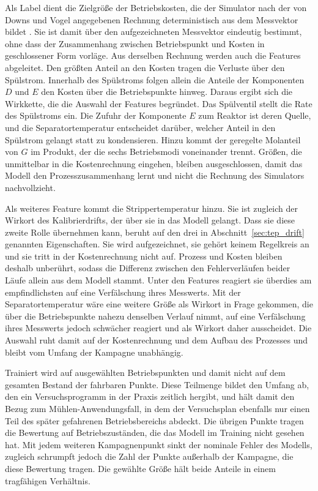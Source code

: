%
Als Label dient die Zielgröße der Betriebskosten, die der Simulator nach der von Downs und Vogel angegebenen Rechnung deterministisch aus dem Messvektor bildet \cite{downs.1993}. Sie ist damit über den aufgezeichneten Messvektor eindeutig bestimmt, ohne dass der Zusammenhang zwischen Betriebspunkt und Kosten in geschlossener Form vorläge. Aus derselben Rechnung werden auch die Features abgeleitet. Den größten Anteil an den Kosten tragen die Verluste über den Spülstrom. Innerhalb des Spülstroms folgen allein die Anteile der Komponenten $D$ und $E$ den Kosten über die Betriebspunkte hinweg. Daraus ergibt sich die Wirkkette, die die Auswahl der Features begründet. Das Spülventil stellt die Rate des Spülstroms ein. Die Zufuhr der Komponente $E$ zum Reaktor ist deren Quelle, und die Separatortemperatur entscheidet darüber, welcher Anteil in den Spülstrom gelangt statt zu kondensieren. Hinzu kommt der geregelte Molanteil von $G$ im Produkt, der die sechs Betriebsmodi voneinander trennt. Größen, die unmittelbar in die Kostenrechnung eingehen, bleiben ausgeschlossen, damit das Modell den Prozesszusammenhang lernt und nicht die Rechnung des Simulators nachvollzieht. \par
%
Als weiteres Feature kommt die Strippertemperatur hinzu. Sie ist zugleich der Wirkort des Kalibrierdrifts, der über sie in das Modell gelangt. Dass sie diese zweite Rolle übernehmen kann, beruht auf den drei in Abschnitt~\ref{sec:tep_drift} genannten Eigenschaften. Sie wird aufgezeichnet, sie gehört keinem Regelkreis an und sie tritt in der Kostenrechnung nicht auf. Prozess und Kosten bleiben deshalb unberührt, sodass die Differenz zwischen den Fehlerverläufen beider Läufe allein aus dem Modell stammt. Unter den Features reagiert sie überdies am empfindlichsten auf eine Verfälschung ihres Messwerts. Mit der Separatortemperatur wäre eine weitere Größe als Wirkort in Frage gekommen, die über die Betriebspunkte nahezu denselben Verlauf nimmt, auf eine Verfälschung ihres Messwerts jedoch schwächer reagiert und als Wirkort daher ausscheidet. Die Auswahl ruht damit auf der Kostenrechnung und dem Aufbau des Prozesses und bleibt vom Umfang der Kampagne unabhängig. \par
%
Trainiert wird auf \tepParamNCampaign{} ausgewählten Betriebspunkten und damit nicht auf dem gesamten Bestand der \genFeasible{} fahrbaren Punkte. Diese Teilmenge bildet den Umfang ab, den ein Versuchsprogramm in der Praxis zeitlich hergibt, und hält damit den Bezug zum Mühlen-Anwendungsfall, in dem der Versuchsplan ebenfalls nur einen Teil des später gefahrenen Betriebsbereichs abdeckt. Die übrigen Punkte tragen die Bewertung auf Betriebszuständen, die das Modell im Training nicht gesehen hat. Mit jedem weiteren Kampagnenpunkt sinkt der nominale Fehler des Modells, zugleich schrumpft jedoch die Zahl der Punkte außerhalb der Kampagne, die diese Bewertung tragen. Die gewählte Größe hält beide Anteile in einem tragfähigen Verhältnis. \par 
